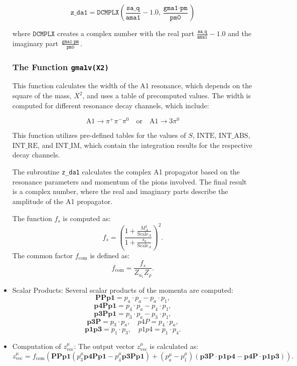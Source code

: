 \documentclass[12pt]{article}
\begin{document}
\begin{itemize}
\[
\texttt{z\_da1} = \texttt{DCMPLX}\left( \frac{\texttt{sa\_q}}{\texttt{ama1}} - 1.0, \frac{\texttt{gma1} \cdot \texttt{pm}}{\texttt{pm0}} \right)
\]

where \(\texttt{DCMPLX}\) creates a complex number with the real part \(\frac{\texttt{sa\_q}}{\texttt{ama1}} - 1.0\) and the imaginary part \(\frac{\texttt{gma1} \cdot \texttt{pm}}{\texttt{pm0}}\).

\subsubsection*{The Function \texttt{gma1v(X2)}}

This function calculates the width of the A1 resonance, which depends on the square of the mass, \(X^2\), and uses a table of precomputed values. The width is computed for different resonance decay channels, which include:

\[
\text{A1} \rightarrow \pi^+ \pi^- \pi^0 \quad \text{or} \quad \text{A1} \rightarrow 3 \pi^0
\]

This function utilizes pre-defined tables for the values of \(S\), \(\text{INTE}\), \(\text{INT\_ABS}\), \(\text{INT\_RE}\), and \(\text{INT\_IM}\), which contain the integration results for the respective decay channels.


The subroutine \texttt{z\_da1} calculates the complex A1 propagator based on the resonance parameters and momentum of the pions involved. The final result is a complex number, where the real and imaginary parts describe the amplitude of the A1 propagator.



\vspace{1cm}



The function \( f_s \) is computed as:
\[
f_s = \left( \frac{1 + \frac{M_{A}^2}{\text{Scale}_A}}{1 + \frac{s_a}{\text{Scale}_A}} \right)^2.
\]
The common factor \( f_{\text{com}} \) is defined as:
\[
f_{\text{com}} = \frac{f_s}{Z_{a_1} Z_{\rho}}.
\]

\item Scalar Products:
Several scalar products of the momenta are computed:
\[
\textbf{PPp1} = p_a \cdot p_a - p_a \cdot p_1,
\]
\[
\textbf{p4Pp1} = p_4 \cdot p_a - p_4 \cdot p_1,
\]
\[
\textbf{p3Pp1} = p_3 \cdot p_a - p_3 \cdot p_1,
\]
\[
\textbf{p3P} = p_3 \cdot p_a, \quad p4P = p_4 \cdot p_a,
\]
\[
\textbf{p1p3} = p_1 \cdot p_3, \quad p1p4 = p_1 \cdot p_4.
\]

\item Computation of \( z_{\text{vec}}^\mu \):
The output vector \( z_{\text{vec}}^\mu \) is calculated as:
\[
z_{\text{vec}}^\mu = f_{\text{com}} \left( \textbf{PPp1} \left( p_3^\mu \textbf{p4Pp1} - p_4^\mu \textbf{p3Pp1} \right) + (p_a^\mu - p_1^\mu) \left( \textbf{p3P} \cdot \textbf{p1p4} - \textbf{p4P} \cdot \textbf{p1p3} \right) \right).
\]


\end{itemize}
\end{document}
